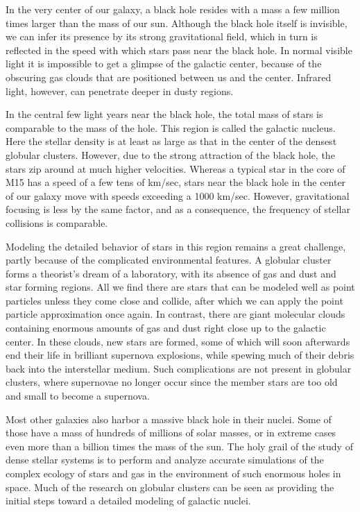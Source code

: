 \documentclass{book}
\begin{document}
In the very center of our galaxy, a black hole resides with a mass a
few million times larger than the mass of our sun.  Although the black
hole itself is invisible, we can infer its presence by its strong
gravitational field, which in turn is reflected in the speed with
which stars pass near the black hole.  In normal visible light it is
impossible to get a glimpse of the galactic center, because of the
obscuring gas clouds that are positioned between us and the center.
Infrared light, however, can penetrate deeper in dusty regions.

In the central few light years near the black hole, the total mass of
stars is comparable to the mass of the hole.  This region is
called the galactic nucleus.  Here the stellar density is at least as
large as that in the center of the densest globular clusters.  However,
due to the strong attraction of the black hole, the stars zip around at
much higher velocities.  Whereas a typical star in the core of M15 has
a speed of a few tens of km/sec, stars near the black hole in the
center of our galaxy move with speeds exceeding a 1000 km/sec.
However, gravitational focusing is less by the same factor, and as a
consequence, the frequency of stellar collisions is comparable.

Modeling the detailed behavior of stars in this region remains a great
challenge, partly because of the complicated environmental features.
A globular cluster forms a theorist's dream of a laboratory, with its
absence of gas and dust and star forming regions.  All we find there
are stars that can be modeled well as point particles unless they come
close and collide, after which we can apply the point particle
approximation once again.  In contrast, there are giant molecular
clouds containing enormous amounts of gas and dust right close up to
the galactic center.  In these clouds, new stars are formed, some of
which will soon afterwards end their life in brilliant supernova
explosions, while spewing much of their debris back into the
interstellar medium.  Such complications are not present in globular
clusters, where supernovae no longer occur since the member stars are
too old and small to become a supernova.

Most other galaxies also harbor a massive black hole in their nuclei.
Some of those have a mass of hundreds of millions of solar masses, or
in extreme cases even more than a billion times the mass of the sun.
The holy grail of the study of dense stellar systems is to perform and
analyze accurate simulations of the complex ecology of stars and gas
in the environment of such enormous holes in space.  Much of the
research on globular clusters can be seen as providing the initial
steps toward a detailed modeling of galactic nuclei.
\end{document}

